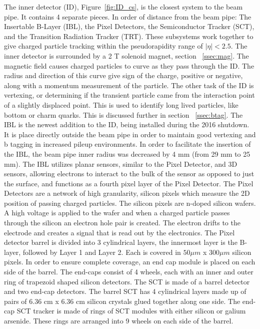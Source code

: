The inner detector (ID), Figure~\ref{fig:ID_cs}, is the closest system to the beam pipe. It contains 4 separate pieces. In order of distance from the beam pipe: The Insertable B-Layer (IBL), the Pixel Detectors, the Semiconductor Tracker (SCT), and the Transition Radiation Tracker (TRT). These subsystems work together to give charged particle tracking within the pseudorapidity range of ${|\eta| < 2.5}$. The inner detector is surrounded by a 2 T solenoid magnet, section ~\ref{ssec:mag}. The magnetic field causes charged particles to curve as they pass through the ID. The radius and direction of this curve give sign of the charge, positive or negative, along with a momentum measurement of the particle. The other task of the ID is vertexing, or determining if the transient particle came from the interaction point of a slightly displaced point. This is used to identify long lived particles, like bottom or charm quarks. This is discussed further in section ~\ref{ssec:btag}. \linebreak
\indent The IBL is the newest addition to the ID, being installed during the 2016 shutdown. It is place directly outside the beam pipe in order to maintain good vertexing and b tagging in increased pileup environments. In order to facilitate the insertion of the IBL, the beam pipe inner radius was decreased by 4 mm (from 29 mm to 25 mm). The IBL utilizes planar sensors, similar to the Pixel Detector, and 3D sensors, allowing electrons to interact to the bulk of the sensor as opposed to just the surface, and functions as a fourth pixel layer of the Pixel Detector.\linebreak
\indent The Pixel Detectors are a network of high granularity, silicon pixels which measure the 2D position of passing charged particles. The silicon pixels are n-doped silicon wafers. A high voltage is applied to the wafer and when a charged particle passes through the silicon an electron hole pair is created. The electron drifts to the electrode and creates a signal that is read out by the electronics.  The Pixel detector barrel is divided into 3 cylindrical layers, the innermost layer is the B-layer, followed by Layer 1 and Layer 2. Each is covered in ${50\mu{m}}$ x ${300\mu{m}}$ silicon pixels. In order to ensure complete coverage, an end cap module is placed on each side of the barrel. The end-caps consist of 4 wheels, each with an inner and outer ring of trapezoid shaped silicon detectors. \linebreak
\indent The SCT is made of a barrel detector and two end-cap detectors. The barrel SCT has 4 cylindrical layers made up of pairs of 6.36 cm x 6.36 cm silicon crystals glued together along one side. The end-cap SCT tracker is made of rings of SCT modules with either silicon or galium arsenide. These rings are arranged into 9 wheels on each side of the barrel.\linebreak
